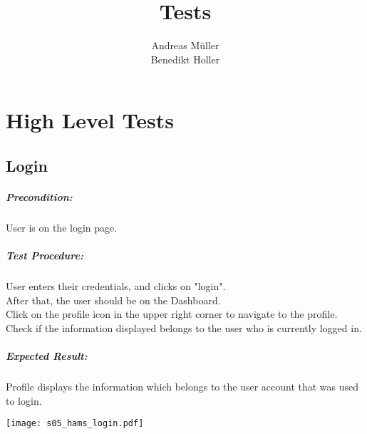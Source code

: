 \documentclass{scrreprt}
\title{Tests}
\author{Andreas Müller \\ Benedikt Holler}
\begin{document}
\maketitle
\tableofcontents

\chapter{High Level Tests}


\begin{minipage}[c]{0.4\textwidth}
\section{Login}

\paragraph{Precondition:}
User is on the login page.
\\
\paragraph{Test Procedure:}
User enters their credentials, and clicks on "login". \\
After that, the user should be on the Dashboard.\\
Click on the profile icon in the upper right corner to navigate to the
profile.\\
Check if the information displayed belongs to the user who is currently logged in.
\\
\paragraph{Expected Result:}
Profile displays the information which belongs to the user account
that was used to login.

\end{minipage}
\hfill
\begin{minipage}[c]{0.5\textwidth}
	\texttt{[image: s05\_hams\_login.pdf]}
\end{minipage}
\end{document}

